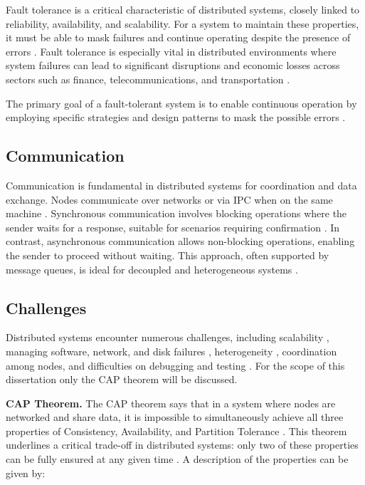 Fault tolerance is a critical characteristic of distributed systems, closely linked to reliability, availability, and scalability. For a system to maintain these properties, it must be able to mask failures and continue operating despite the presence of errors \cite{Tanenbaum2023}. Fault tolerance is especially vital in distributed environments where system failures can lead to significant disruptions and economic losses across sectors such as finance, telecommunications, and transportation \cite{Sari2015}.

The primary goal of a fault-tolerant system is to enable continuous operation by employing specific strategies and design patterns to mask the possible errors \cite{Kleppmann2017}.

\subsection{Communication}

Communication is fundamental in distributed systems for coordination and data exchange. Nodes communicate over networks or via \gls{IPC} when on the same machine \cite{Vitillo2021}. Synchronous communication involves blocking operations where the sender waits for a response, suitable for scenarios requiring confirmation \cite{Tanenbaum2023, Coulouris2012}. In contrast, asynchronous communication allows non-blocking operations, enabling the sender to proceed without waiting. This approach, often supported by message queues, is ideal for decoupled and heterogeneous systems \cite{Tanenbaum2023}.

\subsection{Challenges}

Distributed systems encounter numerous challenges, including scalability \cite{Ahmed2013}, managing software, network, and disk failures \cite{Naik2021, aws-challenges-dist-sys}, heterogeneity \cite{Coulouris2012}, coordination among nodes, and difficulties on debugging and testing \cite{Vitillo2021, aws-challenges-dist-sys}. For the scope of this dissertation only the CAP theorem will be discussed.

\textbf{CAP Theorem.} The CAP theorem says that in a system where nodes are networked and share data, it is impossible to simultaneously achieve all three properties of Consistency, Availability, and Partition Tolerance \cite{Tanenbaum2023, Vitillo2021}. This theorem underlines a critical trade-off in distributed systems: only two of these properties can be fully ensured at any given time \cite{ibm-cap-theorem}. A description of the properties can be given by:


